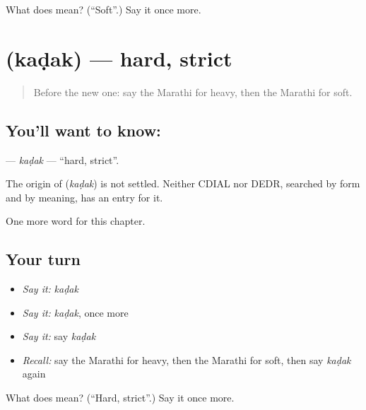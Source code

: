 \begin{tcolorbox}[breakable,colback=teal!4,colframe=teal!35!black,title={Before you move on}]
What does  mean? (\textquotedblleft{}Soft\textquotedblright{}.) Say it once more.
\end{tcolorbox}
\section[\texorpdfstring{\mr{कडक} (kaḍak)}{कडक (kaḍak)}]{ (kaḍak) — hard, strict}

\label{lesson:MR-C148-kadak}



\begin{quote}
Before the new one: say the Marathi for heavy, then the Marathi for soft.
\end{quote}

\subsection*{You'll want to know: }
\textbf{} — \emph{kaḍak} — \textquotedblleft{}hard, strict\textquotedblright{}.

\begin{cousinweb}
The origin of \textbf{} (\emph{kaḍak}) is not settled. Neither CDIAL nor DEDR, searched by form and by meaning, has an entry for it.
\end{cousinweb}

\begin{grammarlens}[title={What you've built}]
One more word for this chapter.
\end{grammarlens}

\subsection*{Your turn}
\begin{itemize}
\raggedright
  \item \emph{Say it:} \emph{kaḍak}
  \item \emph{Say it:} \emph{kaḍak}, once more
  \item \emph{Say it:} say \emph{kaḍak}
  \item \emph{Recall:} say the Marathi for heavy, then the Marathi for soft, then say \emph{kaḍak} again
\end{itemize}

\begin{tcolorbox}[breakable,colback=teal!4,colframe=teal!35!black,title={Before you move on}]
What does  mean? (\textquotedblleft{}Hard, strict\textquotedblright{}.) Say it once more.
\end{tcolorbox}
